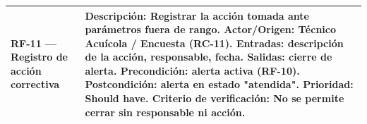 \documentclass[11pt,a4paper]{article}
\begin{document}
\begin{longtable}{|p{3.5cm}|p{12cm}|}
\textbf{RF-11 — Registro de acción correctiva} &
\textbf{Descripción:} Registrar la acción tomada ante parámetros fuera de rango. \newline
\textbf{Actor/Origen:} Técnico Acuícola / Encuesta (RC-11). \newline
\textbf{Entradas:} descripción de la acción, responsable, fecha. \newline
\textbf{Salidas:} cierre de alerta. \newline
\textbf{Precondición:} alerta activa (RF-10). \newline
\textbf{Postcondición:} alerta en estado "atendida". \newline
\textbf{Prioridad:} Should have. \newline
\textbf{Criterio de verificación:} No se permite cerrar sin responsable ni acción. \\ \hline

\end{longtable}
\end{document}
